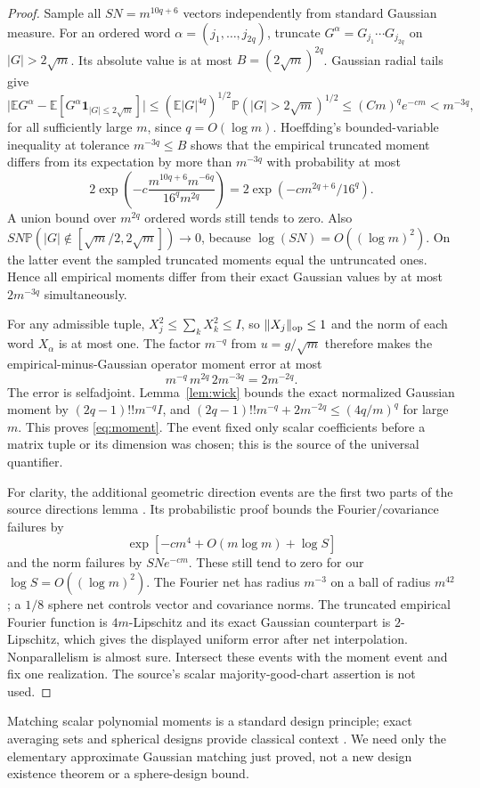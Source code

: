 \documentclass[11pt]{article}
\theoremstyle{remark}\newtheorem{remark}[theorem]{Remark}
\numberwithin{equation}{section}
\newcommand{\E}{\mathbb E}\newcommand{\Prob}{\mathbb P}
\newcommand{\norm}[1]{\lVert #1\rVert}
\begin{document}
\begin{proof}
Sample all $SN=m^{10q+6}$ vectors independently from standard Gaussian
measure. For an ordered word $\alpha=(j_1,\ldots,j_{2q})$, truncate
$G^\alpha=G_{j_1}\cdots G_{j_{2q}}$ on $|G|>2\sqrt m$. Its absolute
value is at most $B=(2\sqrt m)^{2q}$. Gaussian radial tails give
\[
 \big|\E G^\alpha-\E[G^\alpha\mathbf1_{|G|\le2\sqrt m}]\big|
 \le(\E|G|^{4q})^{1/2}\Prob(|G|>2\sqrt m)^{1/2}
 \le (Cm)^q e^{-cm}<m^{-3q},
\]
for all sufficiently large $m$, since $q=O(\log m)$.
Hoeffding's bounded-variable inequality at tolerance $m^{-3q}\le B$
shows that the empirical truncated moment differs from its expectation
by more than $m^{-3q}$ with probability at most
\[
 2\exp\left(-c\frac{m^{10q+6}m^{-6q}}{16^q m^{2q}}\right)
 =2\exp(-c m^{2q+6}/16^q).
\]
A union bound over $m^{2q}$ ordered words still tends to zero.
Also $SN\Prob(|G|\notin[\sqrt m/2,2\sqrt m])\to0$, because
$\log(SN)=O((\log m)^2)$. On the latter event the sampled truncated
moments equal the untruncated ones. Hence all empirical moments differ
from their exact Gaussian values by at most $2m^{-3q}$ simultaneously.

For any admissible tuple, $X_j^2\le\sum_kX_k^2\le I$, so
$\norm{X_j}_{\op}\le1$ and the norm of each word $X_\alpha$ is at most
one. The factor $m^{-q}$ from $u=g/\sqrt m$ therefore makes the
empirical-minus-Gaussian operator moment error at most
\[
 m^{-q}\,m^{2q}\,2m^{-3q}=2m^{-2q}.
\]
The error is selfadjoint. Lemma~\ref{lem:wick} bounds the exact normalized
Gaussian moment by $(2q-1)!!m^{-q}I$, and
$(2q-1)!!m^{-q}+2m^{-2q}\le(4q/m)^q$ for large $m$. This proves
\eqref{eq:moment}. The event fixed only scalar coefficients before a
matrix tuple or its dimension was chosen; this is the source of the
universal quantifier.

For clarity, the additional geometric direction events are the first two
parts of the source directions lemma \cite{source}. Its probabilistic
proof bounds the Fourier/covariance failures by
\[
 \exp[-cm^4+O(m\log m)+\log S]
\]
and the norm failures by $SN e^{-cm}$. These still tend to zero for our
$\log S=O((\log m)^2)$. The Fourier net has radius $m^{-3}$ on a ball of
radius $m^{42}$; a $1/8$ sphere net controls vector and covariance norms.
The truncated empirical Fourier function is $4m$-Lipschitz and its exact
Gaussian counterpart is $2$-Lipschitz, which gives the displayed uniform
error after net interpolation. Nonparallelism is almost sure. Intersect
these events with the moment event and fix one realization. The source's
scalar majority-good-chart assertion is not used.
\end{proof}
Matching scalar polynomial moments is a standard design principle; exact
averaging sets and spherical designs provide classical context
\cite{SZ}. We need only the elementary approximate Gaussian matching
just proved, not a new design existence theorem or a sphere-design bound.
\end{document}
